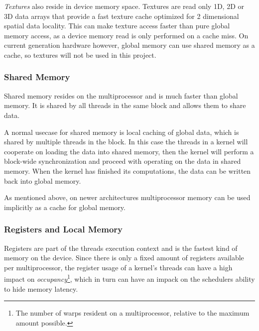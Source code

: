 
\textit{Textures} also reside in device memory space. Textures are read only 1D,
2D or 3D data arrays that provide a fast texture cache optimized for 2
dimensional spatial data locality. This can make texture access faster than pure
global memory access, as a device memory read is only performed on a cache
miss. On current generation hardware however, global memory can use shared
memory as a cache, so textures will not be used in this project.

\subsubsection{Shared Memory}


Shared memory resides on the multiprocessor and is much faster than global
memory. It is shared by all threads in the same block and allows them to share
data.


A normal usecase for shared memory is local caching of global data, which is
shared by multiple threads in the block. In this case the threads in a kernel
will cooperate on loading the data into shared memory, then the kernel will
perform a block-wide synchronization and proceed with operating on the data in
shared memory. When the kernel has finished its computations, the data can be
written back into global memory.


As mentioned above, on newer architectures multiprocessor memory can be used
implicitly as a cache for global memory.




\subsubsection{Registers and Local Memory}


Registers are part of the threads execution context and is the fastest kind of
memory on the device. Since there is only a fixed amount of registers available
per multiprocessor, the register usage of a kernel's threads can have a high
impact on \textit{occupancy}\footnote{The number of warps resident on a
  multiprocessor, relative to the maximum amount possible.}, which in turn can
have an impack on the schedulers ability to hide memory latency.

